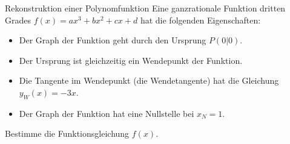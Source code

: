 \begin{aufgabenumgebung}{Rekonstruktion einer Polynomfunktion}
Eine ganzrationale Funktion dritten Grades $f(x) = ax^3 + bx^2 + cx + d$ hat die folgenden Eigenschaften:
\begin{itemize}
    \item Der Graph der Funktion geht durch den Ursprung $P(0|0)$.
    \item Der Ursprung ist gleichzeitig ein Wendepunkt der Funktion.
    \item Die Tangente im Wendepunkt (die Wendetangente) hat die Gleichung $y_W(x) = -3x$.
    \item Der Graph der Funktion hat eine Nullstelle bei $x_N = 1$.
\end{itemize}
Bestimme die Funktionsgleichung $f(x)$.



\end{aufgabenumgebung}


